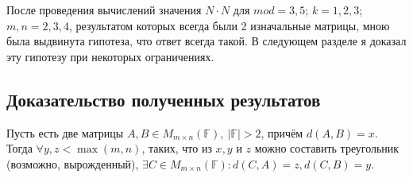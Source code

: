 \documentclass{article}
\begin{document}
После проведения вычислений значения $N \cdot N$ для $mod = 3, 5$; $k = 1, 2, 3$; $m, n = 2, 3, 4$, результатом которых всегда были 2 изначальные матрицы, мною была выдвинута гипотеза, что ответ всегда такой. В следующем разделе я доказал эту гипотезу при некоторых ограничениях.

\subsection{Доказательство полученных результатов} \label{main_proof}
\begin{theorem}
Пусть есть две матрицы $A, B \in M_{m \times n}(\mathbb{F}), \ |\mathbb{F}| > 2$, причём
$d(A, B) = x$. Тогда $\forall y, z < \max(m, n)$, таких, что из $x, y$ и $z$ можно составить треугольник (возможно, вырожденный), $\exists C \in M_{m \times n}(\mathbb{F}) : d(C, A) = z, d(C, B) = y$.
\end{theorem}
\end{document}
